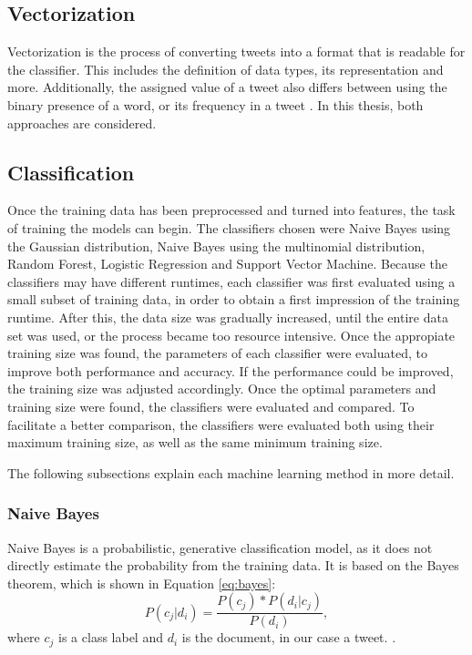 \subsection{Vectorization}
Vectorization is the process of converting tweets into a format that is readable for the classifier. This includes the definition of data types, its representation and more. Additionally, the assigned value of a tweet also differs between using the binary presence of a word, or its frequency in a tweet \cite{DBLP:journals/csur/GiachanouC16}. In this thesis, both approaches are considered.

\subsection{Classification}
Once the training data has been preprocessed and turned into features, the task of training the models can begin. The classifiers chosen were Naive Bayes using the Gaussian distribution, Naive Bayes using the multinomial distribution, Random Forest, Logistic Regression and Support Vector Machine. Because the classifiers may have different runtimes, each classifier was first evaluated using a small subset of training data, in order to obtain a first impression of the training runtime. After this, the data size was gradually increased, until the entire data set was used, or the process became too resource intensive. Once the appropiate training size was found, the parameters of each classifier were evaluated, to improve both performance and accuracy. If the performance could be improved, the training size was adjusted accordingly. Once the optimal parameters and training size were found, the classifiers were evaluated and compared. To facilitate a better comparison, the classifiers were evaluated both using their maximum training size, as well as the same minimum training size.

The following subsections explain each machine learning method in more detail.

    \subsubsection{Naive Bayes}
        Naive Bayes is a probabilistic, generative classification model, as it does not directly estimate the probability from the training data. It is based on the Bayes theorem, which is shown in Equation \eqref{eq:bayes}:
        \begin{equation}
            \label{eq:bayes}
            P(c_j|d_i) = \frac{P(c_j) * P(d_i|c_j)}{P(d_i)},
        \end{equation}
        where $c_j$ is a class label and $d_i$ is the document, in our case a tweet. \cite{DBLP:books/aw/TanSKK2019}. 
        
